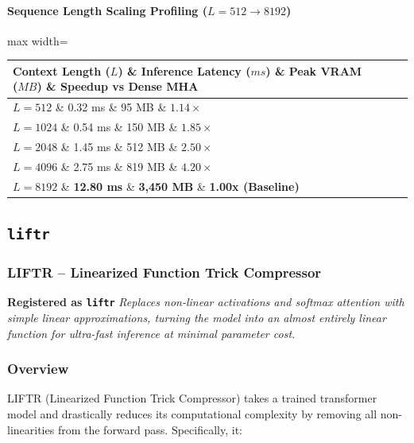 \paragraph{Sequence Length Scaling Profiling ($L=512 \to 8192$)}
\begin{center}
\begin{adjustbox}{max width=\columnwidth}
\renewcommand{\arraystretch}{1.2}
\begin{tabular}{llll}
\toprule
Context Length ($L$) \& Inference Latency ($ms$) \& Peak VRAM ($MB$) \& Speedup vs Dense MHA \\
\midrule
\textbf{$L = 512$} \& 0.32 ms \& 95 MB \& $1.14\times$ \\
\textbf{$L = 1024$} \& 0.54 ms \& 150 MB \& $1.85\times$ \\
\textbf{$L = 2048$} \& 1.45 ms \& 512 MB \& $2.50\times$ \\
\textbf{$L = 4096$} \& 2.75 ms \& 819 MB \& $4.20\times$ \\
\textbf{$L = 8192$} \& \textbf{12.80 ms} \& \textbf{3,450 MB} \& \textbf{1.00x (Baseline)} \\


\bottomrule
\end{tabular}
\end{adjustbox}
\end{center}

\subsection{\texttt{liftr}}
\subsubsection*{LIFTR -- Linearized Function Trick Compressor}

\textbf{Registered as \texttt{liftr}}
\textit{Replaces non-linear activations and softmax attention with simple linear approximations, turning the model into an almost entirely linear function for ultra-fast inference at minimal parameter cost.}


\subsubsection*{Overview}

LIFTR (Linearized Function Trick Compressor) takes a trained transformer model and drastically reduces its computational complexity by removing all non-linearities from the forward pass. Specifically, it:

